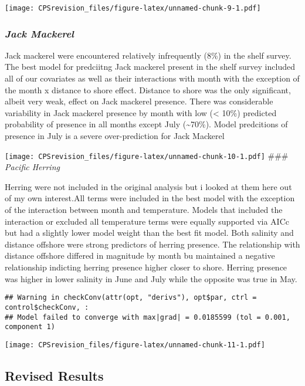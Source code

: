 \documentclass[
]{article}
\begin{document}
\texttt{[image: CPSrevision\_files/figure-latex/unnamed-chunk-9-1.pdf]}

\hypertarget{jack-mackerel}{%
\subsubsection{\texorpdfstring{\emph{Jack
Mackerel}}{Jack Mackerel}}\label{jack-mackerel}}

Jack mackerel were encountered relatively infrequently (8\%) in the
shelf survey. The best model for predciitng Jack mackerel present in the
shelf survey included all of our covariates as well as their
interactions with month with the exception of the month x distance to
shore effect. Distance to shore was the only significant, albeit very
weak, effect on Jack mackerel presence. There was considerable
variability in Jack mackerel presence by month with low (\textless{}
10\%) predicted probability of presence in all months except July
(\textasciitilde70\%). Model predcitions of presence in July is a severe
over-prediction for Jack Mackerel

\texttt{[image: CPSrevision\_files/figure-latex/unnamed-chunk-10-1.pdf]}
\#\#\# \emph{Pacific Herring}

Herring were not included in the original analysis but i looked at them
here out of my own interest.All terms were included in the best model
with the exception of the interaction between month and temperature.
Models that included the interaction or excluded all temperature terms
were equally supported via AICc but had a slightly lower model weight
than the best fit model. Both salinity and distance offshore were strong
predictors of herring presence. The relationship with distance offshore
differed in magnitude by month bu maintained a negative relationship
indicting herring presence higher closer to shore. Herring presence was
higher in lower salinity in June and July while the opposite was true in
May.

\begin{verbatim}
## Warning in checkConv(attr(opt, "derivs"), opt$par, ctrl = control$checkConv, :
## Model failed to converge with max|grad| = 0.0185599 (tol = 0.001, component 1)
\end{verbatim}

\texttt{[image: CPSrevision\_files/figure-latex/unnamed-chunk-11-1.pdf]}

\hypertarget{revised-results}{%
\subsection{Revised Results}\label{revised-results}}
\end{document}
